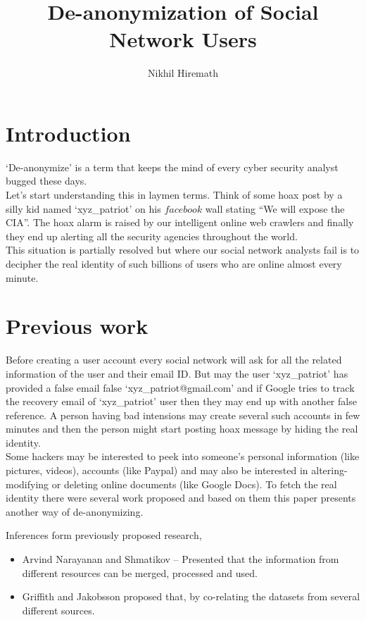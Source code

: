 \documentclass{article}
\title{De-anonymization of Social Network Users}
\author{Nikhil Hiremath}
\begin{document}
\maketitle

\section*{Introduction}
`De-anonymize' is a term that keeps the mind of every cyber security analyst bugged these days.\\

Let's start understanding this in laymen terms. Think of some hoax post by a silly kid named `xyz\_patriot' on his $facebook$ wall stating \enquote{We will expose the CIA}. The hoax alarm is raised by our intelligent online web crawlers and finally they end up alerting all the security agencies throughout the world.\\

This situation is partially resolved but where our social network analysts fail is to decipher the real identity of such billions of users who are online almost every minute.\\

\section*{Previous work}
Before creating a user account every social network will ask for all the related information of the user and their email ID. But may the user `xyz\_patriot' has provided a false email false `xyz\_patriot@gmail.com' and if Google tries to track the recovery email of `xyz\_patriot' user then they may end up with another false reference. A person having bad intensions may create several such accounts in few minutes and then the person might start posting hoax message by hiding the real identity.\\

Some hackers may be interested to peek into someone's personal information (like pictures, videos), accounts (like Paypal) and may also be interested in altering-modifying or deleting online documents (like Google Docs). To fetch the real identity there were several work proposed and based on them this paper presents another way of de-anonymizing.


Inferences form previously proposed research,\\
\begin{itemize}
\item Arvind Narayanan and Shmatikov – Presented that the information from different resources can be merged, processed and used.\\
\item Griffith and Jakobsson proposed that, by co-relating the datasets from several different sources.\\
\end{itemize}
\end{document}
